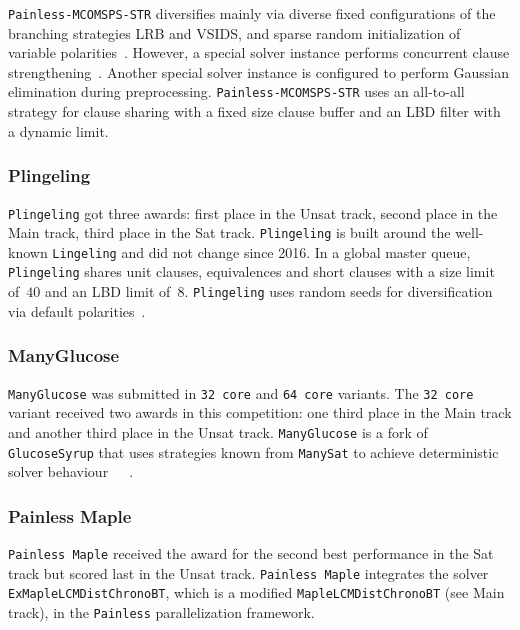 \documentclass{elsarticle}
\newcommand{\solver}[1]{\texttt{#1}}
\begin{document}
\solver{Painless-MCOMSPS-STR} diversifies mainly via diverse fixed configurations of the branching strategies LRB and VSIDS, and sparse random initialization of variable polarities~\cite{Balyo:2015:Hordesat}. 
However, a special solver instance performs concurrent clause strengthening~\cite{Wieringa:2013:CCS}. 
Another special solver instance is configured to perform Gaussian elimination during preprocessing. 
\solver{Painless-MCOMSPS-STR} uses an all-to-all strategy for clause sharing with a fixed size clause buffer and an LBD filter with a dynamic limit. 


\subsubsection{Plingeling} 

\solver{Plingeling} got three awards: first place in the Unsat track, second place in the Main track, third place in the Sat track. 
\solver{Plingeling} is built around the well-known \solver{Lingeling} and did not change since 2016. 
In a global master queue, \solver{Plingeling} shares unit clauses, equivalences and short clauses with a size limit of~$40$ and an LBD limit of~$8$. 
\solver{Plingeling} uses random seeds for diversification via default polarities~\cite{Biere:SC2020,Biere:2012:Lingeling}. 


\subsubsection{ManyGlucose}

\solver{ManyGlucose} was submitted in \solver{32 core} and \solver{64 core} variants. 
The \solver{32 core} variant received two awards in this competition: one third place in the Main track and another third place in the Unsat track. 
\solver{ManyGlucose} is a fork of \solver{GlucoseSyrup} that uses strategies known from \solver{ManySat} to achieve deterministic solver behaviour~\cite{Audemard:2018:GlucoseSyrup}~\cite{Audemard:2014:LazyClauseExchange}~\cite{Hamadi:2009:ManySat}. 


\subsubsection{Painless Maple} 

\solver{Painless Maple} received the award for the second best performance in the Sat track but scored last in the Unsat track. 
\solver{Painless Maple} integrates the solver \solver{ExMapleLCMDistChronoBT}, which is a modified \solver{MapleLCMDistChronoBT} (see Main track), in the \solver{Painless} parallelization framework. 
\end{document}
